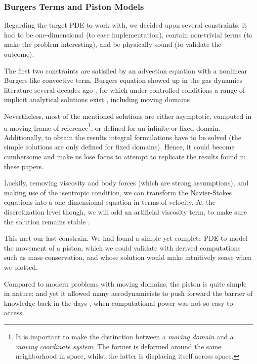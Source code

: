 \documentclass[thesis.tex]{subfiles}
\begin{document}
\subsubsection{Burgers Terms and Piston Models}
Regarding the target PDE to work with, we decided upon several constraints:
it had to be one-dimensional (to ease implementation), 
contain non-trivial terms (to make the problem interesting),
and be physically sound (to validate the outcome).

The first two constraints are satisfied by an advection equation with 
a nonlinear Burgers-like convective term.
Burgers equation showed up in the gas dynamics literature several decades ago
\cite{BURGERS1948171,
moran_shen_1966,
1969nonlinearWavePropagationInARelaxingGas,
1951_quasiLinearParabolicEquationOcuringAerodynamics},
for which under controlled conditions 
a range of implicit analytical solutions exist \cite{1972_TableSolutionsBurgers},
including moving domains \cite{2000_burgersMovingDomainAnalytical}.

Nevertheless, most of the mentioned solutions are either asymptotic,
computed in a moving frame of reference\footnote{
    It is important to make the distinction between a \textit{moving domain}
    and a \textit{moving coordinate system}.
    The former is deformed around the same neighborhood in space,
    whilst the latter is displacing itself across space.
}, 
or defined for an infinite or fixed domain.
Additionally, to obtain the results integral formulations have to be solved 
(the simple solutions are only defined for fixed domains).
Hence, it could become cumbersome and make us lose focus to attempt to replicate
the results found in these papers.

Luckily, removing viscosity and body forces (which are strong assumptions), 
and making use of the isentropic condition,
we can transform the Navier-Stokes equations 
into a one-dimensional equation \cite{1860_Earnshow, nonlinearDiffusiveWaves}
in terms of velocity.
At the discretization level though, 
we will add an artificial viscosity term,
to make sure the solution remains stable \cite{2011_artificialViscosityPOD}.

This met our last constrain. 
We had found a simple yet complete PDE to model the movement of a piston, 
which we could validate with derived computations such as mass conservation,
and whose solution would make intuitively sense when we plotted.

Compared to modern problems with moving domains,
the piston is quite simple in nature;
and yet it allowed many aerodynamicists to push forward the barrier of knowledge 
back in the days \cite{1956_PistonTheoryNewAerodynamicTool},
when computational power was not so easy to access. 
\end{document}
